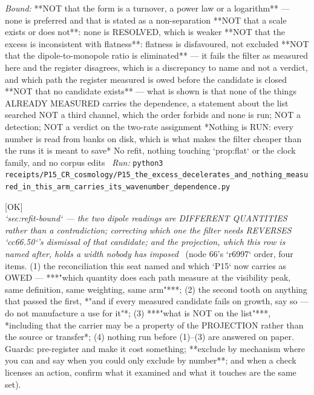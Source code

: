\begin{description}
 \emph{Bound:}  **NOT that the form is a turnover, a power law or a logarithm** --- none is preferred and that is stated as a non-separation  **NOT that a scale exists or does not**: none is RESOLVED, which is weaker  **NOT that the excess is inconsistent with flatness**: flatness is disfavoured, not excluded  **NOT that the dipole-to-monopole ratio is eliminated** --- it fails the filter as measured here and the register disagrees, which is a discrepancy to name and not a verdict, and which path the register measured is owed before the candidate is closed  **NOT that no candidate exists** --- what is shown is that none of the things ALREADY MEASURED carries the dependence, a statement about the list searched  NOT a third channel, which the order forbids and none is run; NOT a detection; NOT a verdict on the two-rate assignment  *Nothing is RUN: every number is read from banks on disk, which is what makes the filter cheaper than the runs it is meant to save*  No refit, nothing touching `prop:flat` or the clock family, and no corpus edits
\ \emph{Run:} \texttt{python3 receipts/P15\_CR\_cosmology/P15\_the\_excess\_decelerates\_and\_nothing\_measured\_in\_this\_arm\_carries\_its\_wavenumber\_dependence.py}
\item[\rcptlabel{P15_the_two_readings_are_different_quantities_and_the_projection_width_is_the_unmeasured_one}{P15R198}\textbf{P15R198}\quad\texttt{P15\_the\_two\_readings\_are\_different\_quantities\_and\_the\_projection\_width\_is\_the\_unmeasured\_one}]\hfill\textsf{[OK]}\\
\textit{`sec:refit-bound` --- the two dipole readings are DIFFERENT QUANTITIES rather than a contradiction; correcting which one the filter needs REVERSES `cc66.50`'s dismissal of that candidate; and the projection, which this row is named after, holds a width nobody has imposed} \ (node 66's `r6997` order, four items. (1) the reconciliation this seat named and which `P15` now carries as OWED --- ***"which quantity does each path measure at the visibility peak, same definition, same weighting, same arm"***; (2) the second tooth on anything that passed the first,  *"and if every measured candidate fails on growth, say so --- do not manufacture a use for it"*; (3) ***"what is NOT on the list"***,  *including that the carrier may be a property of the PROJECTION rather than the source or transfer*; (4) nothing run before (1)--(3) are answered on paper.  Guards: pre-register and make it cost something; **exclude by mechanism where you can and say when you could only exclude by number**; and when a check licenses an action, confirm what it examined and what it touches are the same set). 

\end{description}
